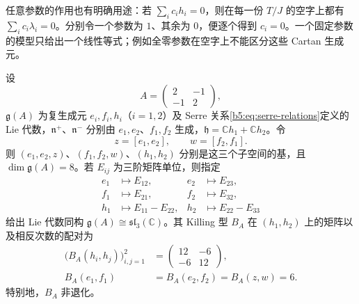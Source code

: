 \ProseParagraphBreak

任意参数的作用也有明确用途：若 \(\sum_i c_ih_i=0\)，则在每一份 \(T/J\) 的空字上都有 \(\sum_i c_i\lambda_i=0\)。分别令一个参数为 \(1\)、其余为 \(0\)，便逐个得到 \(c_i=0\)。一个固定参数的模型只给出一个线性等式；例如全零参数在空字上不能区分这些 Cartan 生成元。

\begin{proposition}\label{b5:prop:a2-serre-matrix-model}
	设
	\[
		A=\begin{pmatrix}2&-1\\-1&2\end{pmatrix},
	\]
	\(\mathfrak g(A)\) 为复生成元 \(e_i,f_i,h_i\)（\(i=1,2\)）及 Serre 关系\eqref{b5:eq:serre-relations}定义的 Lie 代数，\(\mathfrak n^+\)、\(\mathfrak n^-\) 分别由 \(e_1,e_2\)、\(f_1,f_2\) 生成，\(\mathfrak h=\mathbb Ch_1+\mathbb Ch_2\)。令
	\[
		z=[e_1,e_2],\qquad w=[f_2,f_1].
	\]
	则 \((e_1,e_2,z)\)、\((f_1,f_2,w)\)、\((h_1,h_2)\) 分别是这三个子空间的基，且 \(\dim\mathfrak g(A)=8\)。若 \(E_{ij}\) 为三阶矩阵单位，则指定
	\[
		\begin{aligned}
			e_1&\longmapsto E_{12},&e_2&\longmapsto E_{23},\\
			f_1&\longmapsto E_{21},&f_2&\longmapsto E_{32},\\
			h_1&\longmapsto E_{11}-E_{22},&h_2&\longmapsto E_{22}-E_{33}
		\end{aligned}
	\]
	给出 Lie 代数同构 \(\mathfrak g(A)\cong\mathfrak{sl}_3(\mathbb C)\)。其 Killing 型 \(B_A\) 在 \((h_1,h_2)\) 上的矩阵以及相反次数的配对为
	\[
		\begin{aligned}
			\bigl(B_A(h_i,h_j)\bigr)_{i,j=1}^2
			&=\begin{pmatrix}12&-6\\-6&12\end{pmatrix},\\
			B_A(e_1,f_1)&=B_A(e_2,f_2)=B_A(z,w)=6.
		\end{aligned}
	\]
	特别地，\(B_A\) 非退化。
\end{proposition}
